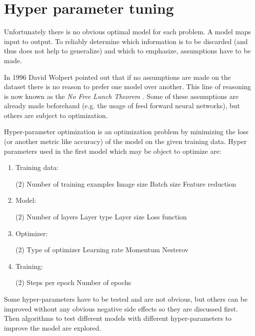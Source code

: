 \section{Hyper parameter tuning}\label{ch:hyper_parameter_tuning}

Unfortunately there is no obvious optimal model for each problem.
A model maps input to output.
To reliably determine which information is to be discarded (and thus does not help to generalize) and which to emphasize, assumptions have to be made. %

In 1996 David Wolpert pointed out that if no assumptions are made on the dataset there is no reason to prefer one model over another.
This line of reasoning is now known as the \textit{No Free Lunch Theorem} \cite{Wolpert1996}.
Some of these assumptions are already made beforehand (e.g. the usage of feed forward neural networks), but others are subject to optimization. %

Hyper-parameter optimization is an optimization problem by minimizing the loss (or another metric like accuracy) of the model on the given training data.
Hyper parameters used in the first model which may be object to optimize are:

\begin{enumerate}
    \item Training data:
    \begin{tasks}(2)
        \task Number of training examples
        \task Image size
        \task Batch size
        \task Feature reduction
    \end{tasks}
    \item Model:
    \begin{tasks}(2)
        \task Number of layers
        \task Layer type
        \task Layer size
        \task Loss function
    \end{tasks}
    \item Optimizer:
    \begin{tasks}(2)
        \task Type of optimizer
        \task Learning rate
        \task Momentum
        \task Nesterov
    \end{tasks}
    \item Training:
    \begin{tasks}(2)
        \task Steps per epoch
        \task Number of epochs
    \end{tasks}
\end{enumerate}

Some hyper-parameters have to be tested and are not obvious, but others can be improved without any obvious negative side effects so they are discussed first. Then algorithms to test different models with different hyper-parameters to improve the model are explored.

